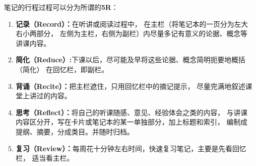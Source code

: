 \begin{shaded}
\begin{center}
	\end{center}
	
	笔记的行程过程可以分为所谓的{\bf 5R}：
	
	\begin{enumerate}[Step1]
	  \item {\bf 记录（Record）：}在听讲或阅读过程中，
	  在主栏（将笔记本的一页分为左大右小两部分，
	  左侧为主栏，右侧为副栏）内尽量多记有意义的论据、概念等讲课内容。
	  \item {\bf 简化（Reduce）:}下课以后，尽可能及早将这些论据、概念简明扼要地概括（简化）
	  在回忆栏，即副栏。
	  \item {\bf 背诵（Recite）：}把主栏遮住，只用回忆栏中的摘记提示，
	  尽量完满地叙述课堂上讲过的内容。
	  \item {\bf 思考（Reflect）：}将自己的听课随感、意见、经验体会之类的内容，
	  与讲课内容区分开，写在卡片或笔记本的某一单独部分，加上标题和索引，
	  编制成提纲、摘要，分成类目。并随时归档。
	  \item {\bf 复习（Review）：}每周花十分钟左右时间，快速复习笔记，主要是先看回忆栏，
	  适当看主栏。
	\end{enumerate}
	

\end{shaded}

